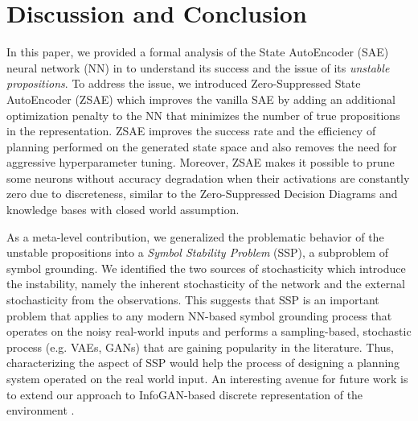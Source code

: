 \section{Discussion and Conclusion}
\label{conclusion}

In this paper, we provided a formal analysis of the State AutoEncoder
(SAE) neural network (NN) in \latentplanner \cite{Asai2018} to
understand its success and 
the issue of its \emph{unstable propositions}.
% 
To address the issue,
we introduced Zero-Suppressed State AutoEncoder (ZSAE) which
improves the vanilla SAE by
adding an additional optimization penalty to the NN
that minimizes the number of true propositions in the representation.
% 
ZSAE improves the success rate and the efficiency of planning performed on
the generated state space and
also removes the need for aggressive hyperparameter tuning.
% 
Moreover, 
ZSAE makes it possible to prune some neurons without accuracy degradation
when their activations are constantly zero due to discreteness,
similar to the Zero-Suppressed Decision Diagrams \cite{minato1993zero} and
knowledge bases with closed world assumption.

As a meta-level contribution,
we generalized the problematic behavior of the unstable propositions
into a \emph{Symbol Stability Problem} (SSP), a subproblem of symbol grounding.
% 
We identified the two sources of stochasticity which introduce the instability,
namely
the inherent stochasticity of the network and
the external stochasticity from the observations.
% 
This suggests that
SSP is an important problem that applies to any modern NN-based symbol grounding process
that operates on the noisy real-world inputs and
performs a sampling-based, stochastic process (e.g. VAEs, GANs) that are gaining popularity in the literature.
Thus, characterizing the aspect of SSP would help the process of designing a planning system operated on the real world input.
An interesting avenue for future work is to extend our approach to InfoGAN-based
discrete representation of the environment \cite{kurutach2018learning}.

